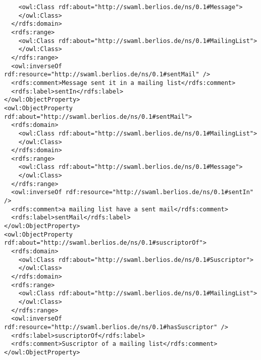 \begin{verbatim}
    <owl:Class rdf:about="http://swaml.berlios.de/ns/0.1#Message">
    </owl:Class>
  </rdfs:domain>
  <rdfs:range>
    <owl:Class rdf:about="http://swaml.berlios.de/ns/0.1#MailingList">
    </owl:Class>
  </rdfs:range>
  <owl:inverseOf rdf:resource="http://swaml.berlios.de/ns/0.1#sentMail" />
  <rdfs:comment>Message sent it in a mailing list</rdfs:comment>
  <rdfs:label>sentIn</rdfs:label>
</owl:ObjectProperty>
<owl:ObjectProperty rdf:about="http://swaml.berlios.de/ns/0.1#sentMail">
  <rdfs:domain>
    <owl:Class rdf:about="http://swaml.berlios.de/ns/0.1#MailingList">
    </owl:Class>
  </rdfs:domain>
  <rdfs:range>
    <owl:Class rdf:about="http://swaml.berlios.de/ns/0.1#Message">
    </owl:Class>
  </rdfs:range>
  <owl:inverseOf rdf:resource="http://swaml.berlios.de/ns/0.1#sentIn" />
  <rdfs:comment>a mailing list have a sent mail</rdfs:comment>
  <rdfs:label>sentMail</rdfs:label>
</owl:ObjectProperty>
<owl:ObjectProperty rdf:about="http://swaml.berlios.de/ns/0.1#suscriptorOf">
  <rdfs:domain>
    <owl:Class rdf:about="http://swaml.berlios.de/ns/0.1#Suscriptor">
    </owl:Class>
  </rdfs:domain>
  <rdfs:range>
    <owl:Class rdf:about="http://swaml.berlios.de/ns/0.1#MailingList">
    </owl:Class>
  </rdfs:range>
  <owl:inverseOf rdf:resource="http://swaml.berlios.de/ns/0.1#hasSuscriptor" />
  <rdfs:label>suscriptorOf</rdfs:label>
  <rdfs:comment>Suscriptor of a mailing list</rdfs:comment>
</owl:ObjectProperty>


\end{verbatim}

